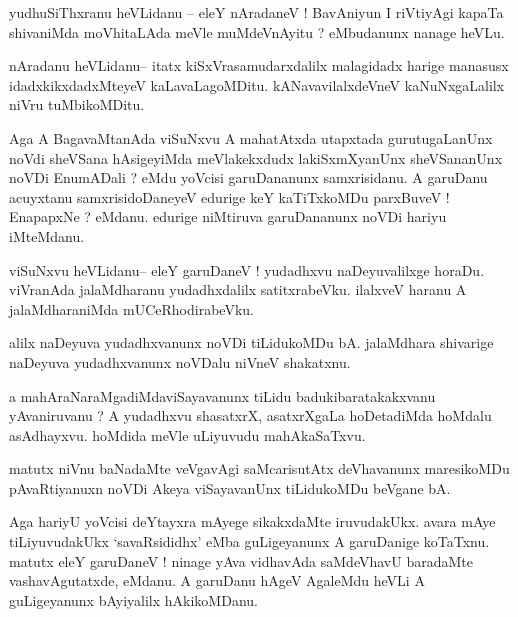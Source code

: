 \documentclass{article}
\begin{document}
\begin{mn}%
yudhuSiThxranu heVLidanu -- eleY nAradaneV ! BavAniyun I riVtiyAgi kapaTa shivaniMda 
moVhitaLAda meVle muMdeVnAyitu ? eMbudanunx nanage heVLu.
\end{mn}

\begin{mn}%
nAradanu heVLidanu-- itatx kiSxVrasamudarxdalilx malagidadx harige manasusx 
idadxkikxdadxMteyeV kaLavaLagoMDitu. kANavavilalxdeVneV kaNuNxgaLalilx niVru tuMbikoMDitu.
\end{mn}

\begin{mn}%
Aga A BagavaMtanAda viSuNxvu A mahatAtxda utapxtada gurutugaLanUnx noVdi sheVSana 
hAsigeyiMda meVlakekxdudx lakiSxmXyanUnx sheVSananUnx noVDi EnumADali ? eMdu yoVcisi 
garuDananunx samxrisidanu. A garuDanu acuyxtanu samxrisidoDaneyeV edurige keY kaTiTxkoMDu 
parxBuveV ! EnapapxNe ? eMdanu. edurige niMtiruva garuDananunx noVDi hariyu iMteMdanu.
\end{mn}

\begin{mn}%
viSuNxvu heVLidanu-- eleY garuDaneV ! yudadhxvu naDeyuvalilxge horaDu. viVranAda 
jalaMdharanu yudadhxdalilx satitxrabeVku. ilalxveV haranu A jalaMdharaniMda mUCeRhodirabeVku.
\end{mn}

\begin{mn}%
alilx naDeyuva yudadhxvanunx noVDi tiLidukoMDu bA. jalaMdhara shivarige naDeyuva 
yudadhxvanunx noVDalu niVneV shakatxnu.
\end{mn}

\begin{mn}%
a mahAraNaraMgadiMdaviSayavanunx tiLidu badukibaratakakxvanu yAvaniruvanu ? A yudadhxvu 
shasatxrX, asatxrXgaLa hoDetadiMda hoMdalu asAdhayxvu. hoMdida meVle uLiyuvudu mahAkaSaTxvu.
\end{mn}

\begin{mn}%
matutx niVnu baNadaMte veVgavAgi saMcarisutAtx deVhavanunx maresikoMDu pAvaRtiyanuxn noVDi 
Akeya viSayavanUnx tiLidukoMDu beVgane bA.
\end{mn}

\begin{mn}%
Aga hariyU yoVcisi deYtayxra mAyege sikakxdaMte iruvudakUkx. avara mAye tiLiyuvudakUkx 
`savaRsididhx' eMba guLigeyanunx A garuDanige koTaTxnu. matutx eleY garuDaneV ! ninage yAva 
vidhavAda saMdeVhavU baradaMte vashavAgutatxde, eMdanu. A garuDanu hAgeV AgaleMdu heVLi A 
guLigeyanunx bAyiyalilx hAkikoMDanu.
\end{mn}
\end{document}
